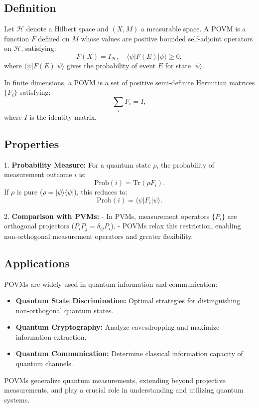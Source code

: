\subsection{Definition}
Let \( \mathcal{H} \) denote a Hilbert space and \( (X, M) \) a measurable space. A POVM is a function \( F \) defined on \( M \) whose values are positive bounded self-adjoint operators on \( \mathcal{H} \), satisfying:
\[
F(X) = I_{\mathcal{H}}, \quad \langle \psi | F(E) | \psi \rangle \geq 0,
\]
where \( \langle \psi | F(E) | \psi \rangle \) gives the probability of event \( E \) for state \( |\psi\rangle \). 

In finite dimensions, a POVM is a set of positive semi-definite Hermitian matrices \( \{F_i\} \) satisfying:
\[
\sum_i F_i = I,
\]
where \( I \) is the identity matrix.

\subsection{Properties}
1. \textbf{Probability Measure:} For a quantum state \( \rho \), the probability of measurement outcome \( i \) is:
   \[
   \text{Prob}(i) = \text{Tr}(\rho F_i).
   \]
   If \( \rho \) is pure (\( \rho = |\psi\rangle\langle\psi| \)), this reduces to:
   \[
   \text{Prob}(i) = \langle \psi | F_i | \psi \rangle.
   \]

2. \textbf{Comparison with PVMs:} 
   - In PVMs, measurement operators \( \{P_i\} \) are orthogonal projectors (\( P_iP_j = \delta_{ij}P_i \)).
   - POVMs relax this restriction, enabling non-orthogonal measurement operators and greater flexibility.

\subsection{Applications}
POVMs are widely used in quantum information and communication:
\begin{itemize}
    \item \textbf{Quantum State Discrimination:} Optimal strategies for distinguishing non-orthogonal quantum states.
    \item \textbf{Quantum Cryptography:} Analyze eavesdropping and maximize information extraction.
    \item \textbf{Quantum Communication:} Determine classical information capacity of quantum channels.
\end{itemize}

POVMs generalize quantum measurements, extending beyond projective measurements, and play a crucial role in understanding and utilizing quantum systems.
